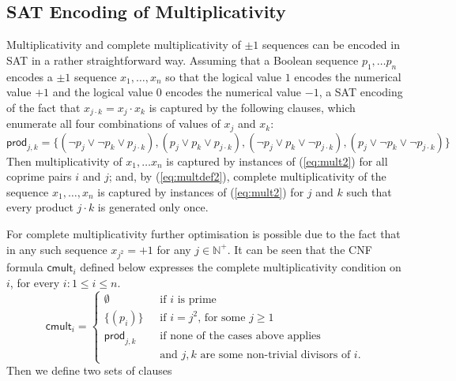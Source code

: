 \documentclass{article} \usepackage[utf8]{inputenc}
\newcommand*{\natP}{\ensuremath{\mathbb{N}^{+}}}
\newcommand*{\cmult}{\ensuremath{\mathsf{cmult}}}
\begin{document}
\subsection{SAT Encoding of  Multiplicativity}
Multiplicativity and complete multiplicativity of $\pm1$ sequences can be
encoded in SAT in a rather straightforward way. Assuming that a Boolean
sequence $p_1,\dots p_n$ encodes a $\pm1$ sequence $x_1,\dots,x_n$ so that the
logical value $1$  encodes the numerical value $+1$ and the logical value $0$
encodes the numerical value $-1$, a SAT encoding of the fact that 
$x_{j\cdot k} = x_j\cdot x_k$ 
is captured by the following clauses, which 
enumerate all four combinations of values of $x_j$ and $x_k$:
\begin{equation}\label{eq:mult2}
\textsf{prod}_{j,k} = \{
(\lnot p_{j}\lor \lnot p_{k}\lor p_{j\cdot k}),
(p_{j}\lor p_{k}\lor p_{j\cdot k}),
(\lnot p_{j}\lor  p_{k}\lor \lnot p_{j\cdot k}),
(p_{j}\lor \lnot p_{k}\lor \lnot p_{j\cdot k})\} \end{equation}
Then multiplicativity of $x_1,\dots x_n$ is captured by instances of (\ref{eq:mult2}) for
all coprime pairs $i$ and $j$; and, by (\ref{eq:multdef2}), complete multiplicativity
of the sequence $x_1,\dots, x_n$ is captured by instances of (\ref{eq:mult2}) for $j$
and $k$ such that every product $j\cdot k$ is generated only once.

For complete multiplicativity further optimisation is possible due to the fact
that in any such sequence $x_{j^2} = +1$ for any $j\in\natP$.  
It can be seen that the CNF formula $\cmult_i$  defined below 
expresses the complete multiplicativity condition on  $i$,
for every $i: 1\leq i \leq n$.
$$
\cmult_i = 
\left\{
\begin{array}{ll}
 \emptyset  & \textrm{ if $i$ is prime}\\[5pt]
\{(p_i)\}  & \textrm{ if $i = j^2$, for some $j\geq 1$} \\[5pt]
\mathsf{prod}_{j,k}\quad &\textrm{ if none of the cases above applies}\\
& \textrm{ and $j,k$ are some non-trivial divisors of $i$.}
\end{array}
\right.
$$
Then we define two sets of clauses 
\end{document}
